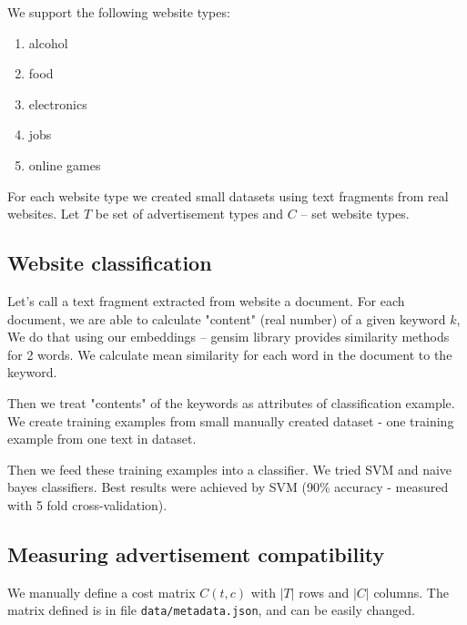 \documentclass[a4paper]{article}
\begin{document}
We support the following website types:
\begin{enumerate}
    \item alcohol
    \item food
    \item electronics
    \item jobs
    \item online games
\end{enumerate}

For each website type we created small datasets using text fragments from real websites.
Let $T$ be set of advertisement types and $C$ -- set website types.


\subsection{Website classification}

Let's call a text fragment extracted from website a document.
For each document, we are able to calculate "content" (real number) of a given keyword $k$,
We do that using our embeddings -- gensim library provides similarity methods for 2 words.
We calculate mean similarity for each word in the document to the keyword.

Then we treat "contents" of the keywords as attributes of classification example.
We create training examples from small manually created dataset - one training example from one text in dataset.

Then we feed these training examples into a classifier.
We tried SVM and naive bayes classifiers.
Best results were achieved by SVM (90\% accuracy - measured with 5 fold cross-validation).


\subsection{Measuring advertisement compatibility}
\label{mainlogic}

We manually define a cost matrix $C(t, c)$ 
with $|T|$ rows and $|C|$ columns.
The matrix defined is in file \texttt{data/metadata.json},
and can be easily changed.
\end{document}
